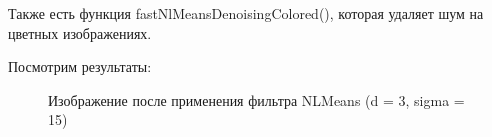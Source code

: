 \documentclass[14pt,a4paper,report]{report}
\begin{document}
Также есть функция fastNlMeansDenoisingColored(), которая удаляет шум на цветных изображениях.

Посмотрим результаты:

\begin{figure}[h]
\begin{minipage}[h]{0.47\linewidth}
\end{minipage}
\hfill
\begin{minipage}[h]{0.47\linewidth}
\end{minipage}
\caption{Изображение после применения фильтра NLMeans (d = 3, sigma = 15)}
\label{ris:image1}
\end{figure}
\end{document}
